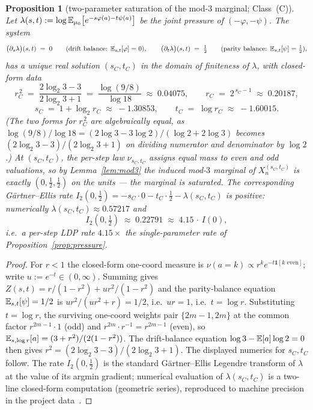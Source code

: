 \documentclass[11pt]{amsart}
\newtheorem{proposition}[theorem]{Proposition}
\theoremstyle{definition}
\theoremstyle{remark}
\begin{document}
\begin{proposition}[two-parameter saturation of the mod-$3$ marginal; Class~(C)]\label{prop:classC}
Let $\lambda(s,t):=\log\mathbb{E}_{\mu_0}\big[e^{-s\varphi(a)-t\psi(a)}\big]$ be the joint pressure
of $(-\varphi,-\psi)$. The system
\[
  \big(\partial_s\lambda\big)(s,t)\;=\;0
  \qquad\text{(drift balance: $\mathbb{E}_{s,t}[\varphi]=0$)},
  \qquad
  \big(\partial_t\lambda\big)(s,t)\;=\;\tfrac12
  \qquad\text{(parity balance: $\mathbb{E}_{s,t}[\psi]=\tfrac12$)},
\]
has a unique real solution $(s_C,t_C)$ in the domain of finiteness of $\lambda$, with closed-form data
\[
  r_C^{\,2}\;=\;\frac{2\log_2 3 -3}{2\log_2 3+1}\;=\;\frac{\log(9/8)}{\log 18}\;\approx\;0.04075,
  \qquad
  r_C\;=\;2^{\,s_C-1}\;\approx\;0.20187,
\]
\[
  s_C\;=\;1+\log_2 r_C\;\approx\;-1.30853,
  \qquad
  t_C\;=\;\log r_C\;\approx\;-1.60015.
\]
(The two forms for $r_C^{\,2}$ are algebraically equal, as $\log(9/8)/\log 18 = (2\log 3-3\log 2)/(\log 2+2\log 3)$ becomes $(2\log_2 3-3)/(2\log_2 3+1)$ on dividing numerator and denominator by $\log 2$.)
At $(s_C,t_C)$, the per-step law $\nu_{s_C,t_C}$ assigns equal mass to even and odd valuations, so by
Lemma~\ref{lem:mod3} the induced mod-$3$ marginal of $X_n^{(s_C,t_C)}$ is exactly $(0,\tfrac12,\tfrac12)$
on the units --- the marginal is saturated. The corresponding Gärtner--Ellis rate
$I_2(0,\tfrac12)=-s_C\cdot 0-t_C\cdot\tfrac12-\lambda(s_C,t_C)$ is positive: numerically
$\lambda(s_C,t_C)\approx 0.57217$ and
\[
  I_2(0,\tfrac12)\;\approx\;0.22791\;\approx\;4.15\,\cdot\,I(0),
\]
i.e.\ a per-step LDP rate $4.15\times$ the single-parameter rate of Proposition~\ref{prop:pressure}.
\end{proposition}

\begin{proof}
For $r<1$ the closed-form one-coord measure is $\nu(a=k)\propto r^k e^{-t\mathbf{1}[k\text{ even}]}$;
write $u:=e^{-t}\in(0,\infty)$. Summing gives $Z(s,t)=r/(1-r^2)+ur^2/(1-r^2)$ and the parity-balance
equation $\mathbb{E}_{s,t}[\psi]=1/2$ is $ur^2/(ur^2+r)=1/2$, i.e.\ $ur=1$, i.e.\ $t=\log r$. Substituting $t=\log r$,
the surviving one-coord weights pair $\{2m-1,2m\}$ at the common factor $r^{2m-1}\cdot 1$ (odd) and
$r^{2m}\cdot r^{-1}=r^{2m-1}$ (even), so $\mathbb{E}_{s,\log r}[a]=(3+r^2)/(2(1-r^2))$. The drift-balance
equation $\log 3-\mathbb{E}[a]\log 2=0$ then gives $r^2=(2\log_2 3-3)/(2\log_2 3+1)$. The displayed numerics
for $s_C,t_C$ follow. The rate $I_2(0,\tfrac12)$ is the standard Gärtner--Ellis Legendre transform of
$\lambda$ at the value of its argmin gradient; numerical evaluation of $\lambda(s_C,t_C)$ is a
two-line closed-form computation (geometric series), reproduced to machine precision in the project
data~\citep[\texttt{collatz\_multitilt\_probe.py}]{tao2022}.
\end{proof}
\end{document}
